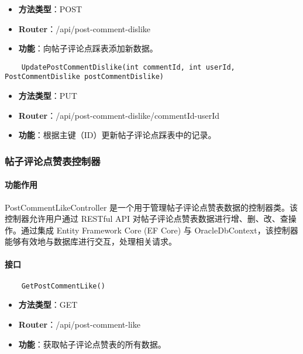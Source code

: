 \begin{itemize}
	\item \textbf{方法类型}：POST
	\item \textbf{Router}：/api/post-comment-dislike
	\item \textbf{功能}：向帖子评论点踩表添加新数据。
\end{itemize}

\begin{verbatim}
	UpdatePostCommentDislike(int commentId, int userId, PostCommentDislike postCommentDislike)
\end{verbatim}

\begin{itemize}
	\item \textbf{方法类型}：PUT
	\item \textbf{Router}：/api/post-comment-dislike/{commentId}-{userId}
	\item \textbf{功能}：根据主键（ID）更新帖子评论点踩表中的记录。
\end{itemize}

\subsubsection{帖子评论点赞表控制器}

\paragraph{功能作用}

PostCommentLikeController 是一个用于管理帖子评论点赞表数据的控制器类。该控制器允许用户通过 RESTful API 对帖子评论点赞表数据进行增、删、改、查操作。通过集成 Entity Framework Core (EF Core) 与 OracleDbContext，该控制器能够有效地与数据库进行交互，处理相关请求。

\paragraph{接口}

\begin{verbatim}
	GetPostCommentLike()
\end{verbatim}

\begin{itemize}
	\item \textbf{方法类型}：GET
	\item \textbf{Router}：/api/post-comment-like
	\item \textbf{功能}：获取帖子评论点赞表的所有数据。
\end{itemize}

